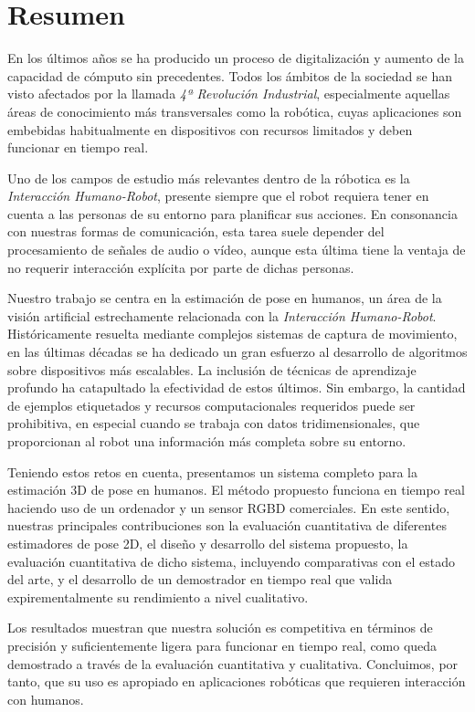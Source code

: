 \chapter*{Resumen}
En los últimos años se ha producido un proceso de digitalización y aumento de la capacidad de cómputo sin precedentes. Todos los ámbitos de la sociedad se han visto afectados por la llamada \emph{4ª Revolución Industrial}, especialmente aquellas áreas de conocimiento más transversales como la robótica, cuyas aplicaciones son embebidas habitualmente en dispositivos con recursos limitados y deben funcionar en tiempo real.

Uno de los campos de estudio más relevantes dentro de la róbotica es la \emph{Interacción Humano-Robot}, presente siempre que el robot requiera tener en cuenta a las personas de su entorno para planificar sus acciones. En consonancia con nuestras formas de comunicación, esta tarea suele depender del procesamiento de señales de audio o vídeo, aunque esta última tiene la ventaja de no requerir interacción explícita por parte de dichas personas.

Nuestro trabajo se centra en la estimación de pose en humanos, un área de la visión artificial estrechamente relacionada con la \emph{Interacción Humano-Robot}. Históricamente resuelta mediante complejos sistemas de captura de movimiento, en las últimas décadas se ha dedicado un gran esfuerzo al desarrollo de algoritmos sobre dispositivos más escalables. La inclusión de técnicas de aprendizaje profundo ha catapultado la efectividad de estos últimos. Sin embargo, la cantidad de ejemplos etiquetados y recursos computacionales requeridos puede ser prohibitiva, en especial cuando se trabaja con datos tridimensionales, que proporcionan al robot una información más completa sobre su entorno.

Teniendo estos retos en cuenta, presentamos un sistema completo para la estimación 3D de pose en humanos. El método propuesto funciona en tiempo real haciendo uso de un ordenador y un sensor RGBD comerciales. En este sentido, nuestras principales contribuciones son la evaluación cuantitativa de diferentes estimadores de pose 2D, el diseño y desarrollo del sistema propuesto, la evaluación cuantitativa de dicho sistema, incluyendo comparativas con el estado del arte, y el desarrollo de un demostrador en tiempo real que valida expirementalmente su rendimiento a nivel cualitativo.

Los resultados muestran que nuestra solución es competitiva en términos de precisión y suficientemente ligera para funcionar en tiempo real, como queda demostrado a través de la evaluación cuantitativa y cualitativa. Concluimos, por tanto, que su uso es apropiado en aplicaciones robóticas que requieren interacción con humanos.